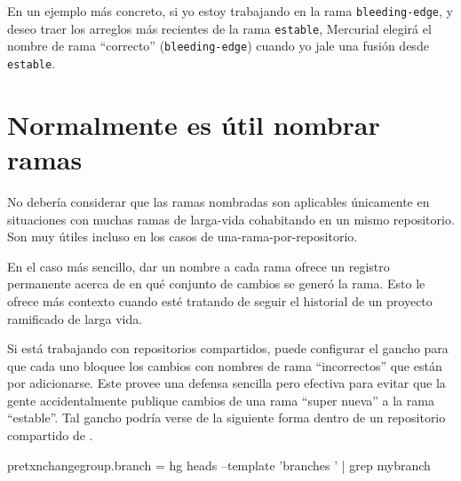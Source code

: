 En un ejemplo más concreto, si yo estoy trabajando en la rama
\texttt{bleeding-edge}, y deseo traer los arreglos más recientes de la
rama \texttt{estable}, Mercurial elegirá el nombre de rama ``correcto''
(\texttt{bleeding-edge}) cuando yo jale una fusión desde \texttt{estable}.

\section{Normalmente es útil nombrar ramas}

No debería considerar que las ramas nombradas son aplicables
únicamente en situaciones con muchas ramas de larga-vida cohabitando
en un mismo repositorio.  Son muy útiles incluso en los casos de
una-rama-por-repositorio.

En el caso más sencillo, dar un nombre a cada rama ofrece un registro
permanente acerca de en qué conjunto de cambios se generó la rama.
Esto le ofrece más contexto cuando esté tratando de seguir el
historial de un proyecto ramificado de larga vida.

Si está trabajando con repositorios compartidos, puede configurar el gancho
 para que cada uno bloquee los cambios con
nombres de rama ``incorrectos'' que están por adicionarse.  Este
provee una defensa sencilla pero efectiva para evitar que la gente
accidentalmente publique cambios de una rama ``super nueva'' a la rama
``estable''.  Tal gancho podría verse de la siguiente forma dentro de
un repositorio compartido de \hgrc.
\begin{codesample2}
  [hooks]
  pretxnchangegroup.branch = hg heads --template '{branches} ' | grep mybranch
\end{codesample2}

